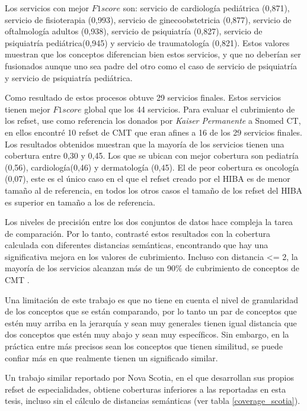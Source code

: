 Los servicios con mejor $F1 score$ son: servicio de cardiología pediátrica (0,871), servicio de fisioterapia (0,993), servicio de ginecoobstetricia (0,877), servicio de oftalmología adultos (0,938), servicio de psiquiatría (0,827), servicio de psiquiatría pediátrica(0,945) y  servicio de traumatología (0,821). Estos valores muestran que los conceptos diferencian bien estos servicios, y que no deberían ser fusionados aunque uno sea padre del otro como el caso de  servicio de psiquiatría y servicio de psiquiatría pediátrica.

Como resultado de estos procesos obtuve 29 servicios finales. Estos servicios tienen mejor $F1 score$ global que los 44 servicios. Para evaluar el cubrimiento de los {\acrshort{refset}}, use como referencia los donados por \textit{Kaiser Permanente }a Snomed CT, en ellos encontré 10 {\acrshort{refset}} de \acrshort{CMT} que eran afines a 16 de los 29 servicios finales. Los resultados obtenidos muestran que la mayoría de los servicios tienen una cobertura entre 0,30 y 0,45. Los que se ubican con mejor cobertura son pediatría (0,56), cardiología(0,46) y dermatología (0,45). El de peor cobertura es oncología (0,07), este es el único caso en el que el {\acrshort{refset}} creado por el \acrshort{HIBA} es de menor tamaño al de referencia, en todos los otros casos el tamaño de los {\acrshort{refset}} del \acrshort{HIBA} es superior en tamaño a los de referencia. 

Los niveles de precisión entre los dos conjuntos de datos hace compleja la tarea de comparación. Por lo tanto, contrasté estos resultados con la cobertura calculada con diferentes distancias semánticas, encontrando que hay una significativa mejora en los valores de cubrimiento. Incluso con distancia \textless= 2,  la mayoría de los servicios alcanzan más de un 90\% de cubrimiento de conceptos de \acrshort{CMT} .

Una limitación de este trabajo es que  no tiene en cuenta el nivel de granularidad de los conceptos que se están comparando, por lo tanto un par de conceptos que estén muy arriba en la jerarquía y sean muy generales tienen igual distancia que dos conceptos que estén muy abajo y sean muy específicos. Sin embargo, en la práctica entre más precisos sean los conceptos que tienen similitud, se puede confiar más en que realmente tienen un significado similar.

Un trabajo similar reportado por Nova Scotia\cite{nova}, en el que desarrollan sus propios {\acrshort{refset}} de especialidades, obtiene coberturas inferiores a las reportadas en esta tesis, incluso sin el cálculo de distancias semánticas (ver tabla \ref{coverage_scotia}). 

